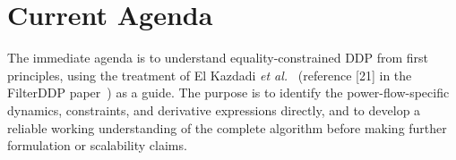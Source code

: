 \section{Current Agenda}

The immediate agenda is to understand equality-constrained DDP from first
principles, using the treatment of El Kazdadi \emph{et al.}~\cite{Kazdadi2021}
(reference [21] in the FilterDDP paper~\cite{Xu2026FilterDDP}) as a guide. The
purpose is to identify the power-flow-specific dynamics, constraints, and
derivative expressions directly, and to develop a reliable working
understanding of the complete algorithm before making further formulation or
scalability claims.
